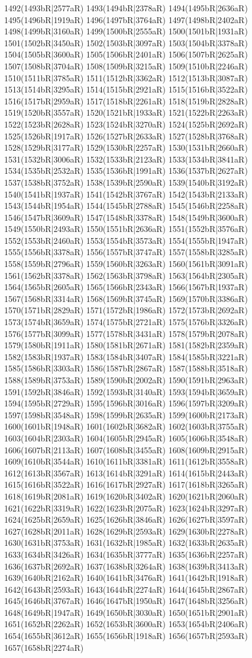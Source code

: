 1492(1493bR|2577aR) 1493(1494bR|2378aR) 1494(1495bR|2636aR) 1495(1496bR|1919aR) 1496(1497bR|3764aR) 1497(1498bR|2402aR) 1498(1499bR|3160aR) 1499(1500bR|2555aR) 1500(1501bR|1931aR) 1501(1502bR|3450aR) 1502(1503bR|3097aR) 1503(1504bR|3378aR) 1504(1505bR|3600aR) 1505(1506bR|2401aR) 1506(1507bR|2625aR) 1507(1508bR|3704aR) 1508(1509bR|3215aR) 1509(1510bR|2246aR) 1510(1511bR|3785aR) 1511(1512bR|3362aR) 1512(1513bR|3087aR) 1513(1514bR|3295aR) 1514(1515bR|2921aR) 1515(1516bR|3522aR) 1516(1517bR|2959aR) 1517(1518bR|2261aR) 1518(1519bR|2828aR) 1519(1520bR|3557aR) 1520(1521bR|1933aR) 1521(1522bR|2263aR) 1522(1523bR|2628aR) 1523(1524bR|3270aR) 1524(1525bR|2692aR) 1525(1526bR|1917aR) 1526(1527bR|2633aR) 1527(1528bR|3768aR) 1528(1529bR|3177aR) 1529(1530bR|2257aR) 1530(1531bR|2660aR) 1531(1532bR|3006aR) 1532(1533bR|2123aR) 1533(1534bR|3841aR) 1534(1535bR|2532aR) 1535(1536bR|1991aR) 1536(1537bR|2627aR) 1537(1538bR|3752aR) 1538(1539bR|2590aR) 1539(1540bR|3192aR) 1540(1541bR|1937aR) 1541(1542bR|3767aR) 1542(1543bR|2133aR) 1543(1544bR|1954aR) 1544(1545bR|2788aR) 1545(1546bR|2258aR) 1546(1547bR|3609aR) 1547(1548bR|3378aR) 1548(1549bR|3600aR) 1549(1550bR|2493aR) 1550(1551bR|2636aR) 1551(1552bR|3576aR) 1552(1553bR|2460aR) 1553(1554bR|3573aR) 1554(1555bR|1947aR) 1555(1556bR|3378aR) 1556(1557bR|3747aR) 1557(1558bR|3285aR) 1558(1559bR|2796aR) 1559(1560bR|3263aR) 1560(1561bR|3091aR) 1561(1562bR|3378aR) 1562(1563bR|3798aR) 1563(1564bR|2305aR) 1564(1565bR|2605aR) 1565(1566bR|2343aR) 1566(1567bR|1937aR) 1567(1568bR|3314aR) 1568(1569bR|3745aR) 1569(1570bR|3386aR) 1570(1571bR|2829aR) 1571(1572bR|1986aR) 1572(1573bR|2692aR) 1573(1574bR|3659aR) 1574(1575bR|2721aR) 1575(1576bR|3326aR) 1576(1577bR|3099aR) 1577(1578bR|3431aR) 1578(1579bR|2078aR) 1579(1580bR|1911aR) 1580(1581bR|2671aR) 1581(1582bR|2359aR) 1582(1583bR|1937aR) 1583(1584bR|3407aR) 1584(1585bR|3221aR) 1585(1586bR|3303aR) 1586(1587bR|2867aR) 1587(1588bR|3518aR) 1588(1589bR|3753aR) 1589(1590bR|2002aR) 1590(1591bR|2963aR) 1591(1592bR|3846aR) 1592(1593bR|3140aR) 1593(1594bR|3659aR) 1594(1595bR|2729aR) 1595(1596bR|3016aR) 1596(1597bR|3209aR) 1597(1598bR|3548aR) 1598(1599bR|2635aR) 1599(1600bR|2173aR) 1600(1601bR|1948aR) 1601(1602bR|3682aR) 1602(1603bR|3755aR) 1603(1604bR|2303aR) 1604(1605bR|2945aR) 1605(1606bR|3548aR) 1606(1607bR|2113aR) 1607(1608bR|3455aR) 1608(1609bR|2915aR) 1609(1610bR|3544aR) 1610(1611bR|3381aR) 1611(1612bR|3558aR) 1612(1613bR|3567aR) 1613(1614bR|3291aR) 1614(1615bR|2443aR) 1615(1616bR|3522aR) 1616(1617bR|2927aR) 1617(1618bR|3265aR) 1618(1619bR|2081aR) 1619(1620bR|3402aR) 1620(1621bR|2060aR) 1621(1622bR|3319aR) 1622(1623bR|2075aR) 1623(1624bR|3297aR) 1624(1625bR|2659aR) 1625(1626bR|3846aR) 1626(1627bR|3597aR) 1627(1628bR|2011aR) 1628(1629bR|2593aR) 1629(1630bR|2278aR) 1630(1631bR|3753aR) 1631(1632bR|1985aR) 1632(1633bR|2635aR) 1633(1634bR|3426aR) 1634(1635bR|3777aR) 1635(1636bR|2257aR) 1636(1637bR|2692aR) 1637(1638bR|3264aR) 1638(1639bR|3413aR) 1639(1640bR|2162aR) 1640(1641bR|3476aR) 1641(1642bR|1918aR) 1642(1643bR|2593aR) 1643(1644bR|2274aR) 1644(1645bR|2867aR) 1645(1646bR|3767aR) 1646(1647bR|1950aR) 1647(1648bR|3256aR) 1648(1649bR|1947aR) 1649(1650bR|3030aR) 1650(1651bR|2901aR) 1651(1652bR|2262aR) 1652(1653bR|3600aR) 1653(1654bR|2406aR) 1654(1655bR|3612aR) 1655(1656bR|1918aR) 1656(1657bR|2593aR) 1657(1658bR|2274aR) 